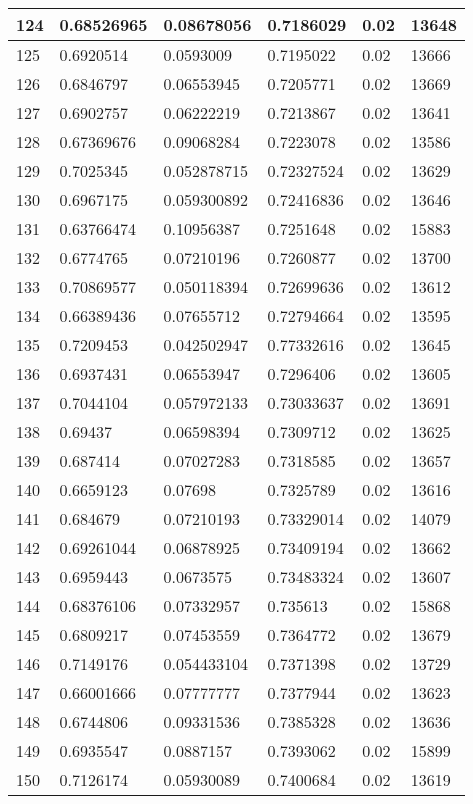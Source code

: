 \begin{longtable}{|l|l|l|l|l|l|}
124 & 0.68526965 & 0.08678056 & 0.7186029 & 0.02 & 13648 \\ \hline 
125 & 0.6920514 & 0.0593009 & 0.7195022 & 0.02 & 13666 \\ \hline 
126 & 0.6846797 & 0.06553945 & 0.7205771 & 0.02 & 13669 \\ \hline 
127 & 0.6902757 & 0.06222219 & 0.7213867 & 0.02 & 13641 \\ \hline 
128 & 0.67369676 & 0.09068284 & 0.7223078 & 0.02 & 13586 \\ \hline 
129 & 0.7025345 & 0.052878715 & 0.72327524 & 0.02 & 13629 \\ \hline 
130 & 0.6967175 & 0.059300892 & 0.72416836 & 0.02 & 13646 \\ \hline 
131 & 0.63766474 & 0.10956387 & 0.7251648 & 0.02 & 15883 \\ \hline 
132 & 0.6774765 & 0.07210196 & 0.7260877 & 0.02 & 13700 \\ \hline 
133 & 0.70869577 & 0.050118394 & 0.72699636 & 0.02 & 13612 \\ \hline 
134 & 0.66389436 & 0.07655712 & 0.72794664 & 0.02 & 13595 \\ \hline 
135 & 0.7209453 & 0.042502947 & 0.77332616 & 0.02 & 13645 \\ \hline 
136 & 0.6937431 & 0.06553947 & 0.7296406 & 0.02 & 13605 \\ \hline 
137 & 0.7044104 & 0.057972133 & 0.73033637 & 0.02 & 13691 \\ \hline 
138 & 0.69437 & 0.06598394 & 0.7309712 & 0.02 & 13625 \\ \hline 
139 & 0.687414 & 0.07027283 & 0.7318585 & 0.02 & 13657 \\ \hline 
140 & 0.6659123 & 0.07698 & 0.7325789 & 0.02 & 13616 \\ \hline 
141 & 0.684679 & 0.07210193 & 0.73329014 & 0.02 & 14079 \\ \hline 
142 & 0.69261044 & 0.06878925 & 0.73409194 & 0.02 & 13662 \\ \hline 
143 & 0.6959443 & 0.0673575 & 0.73483324 & 0.02 & 13607 \\ \hline 
144 & 0.68376106 & 0.07332957 & 0.735613 & 0.02 & 15868 \\ \hline 
145 & 0.6809217 & 0.07453559 & 0.7364772 & 0.02 & 13679 \\ \hline 
146 & 0.7149176 & 0.054433104 & 0.7371398 & 0.02 & 13729 \\ \hline 
147 & 0.66001666 & 0.07777777 & 0.7377944 & 0.02 & 13623 \\ \hline 
148 & 0.6744806 & 0.09331536 & 0.7385328 & 0.02 & 13636 \\ \hline 
149 & 0.6935547 & 0.0887157 & 0.7393062 & 0.02 & 15899 \\ \hline 
150 & 0.7126174 & 0.05930089 & 0.7400684 & 0.02 & 13619 \\ \hline 
\end{longtable}